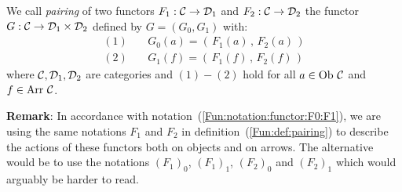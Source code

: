 \begin{defin}\label{Fun:def:pairing}
    We call {\em pairing} of two functors $F_{1}:\mbox{$\cal C$}\to\mbox{${\cal D}_{1}$}$ and
    $F_{2}:\mbox{$\cal C$}\to\mbox{${\cal D}_{2}$}$ the functor $G:\mbox{$\cal C$}\to\mbox{${\cal D}_{1}$}\times\mbox{${\cal D}_{2}$}$
    defined by $G=(G_{0},G_{1})$ with:
        \begin{eqnarray*}
            (1)&\ &G_{0}(a) = (\,F_{1}(a)\,,\,F_{2}(a)\,)\\
            (2)&\ &G_{1}(f) = (\,F_{1}(f)\,,\,F_{2}(f)\,)
        \end{eqnarray*}
    where $\mbox{$\cal C$}, \mbox{${\cal D}_{1}$}, \mbox{${\cal D}_{2}$}$ are categories and $(1)-(2)$ hold
    for all $a\in\mbox{\rm Ob}\ \mbox{$\cal C$}$ and $f\in\mbox{\rm Arr}\ \mbox{$\cal C$}$.
\end{defin}
\noindent
{\bf Remark}: In accordance with notation~(\ref{Fun:notation:functor:F0:F1}),
we are using the same notations $F_{1}$ and $F_{2}$ in 
definition~(\ref{Fun:def:pairing}) to describe the actions of these
functors both on objects and on arrows. The alternative would be to use the
notations $(F_{1})_{0}$, $(F_{1})_{1}$, $(F_{2})_{0}$ and $(F_{2})_{1}$ which 
would arguably be harder to read.

